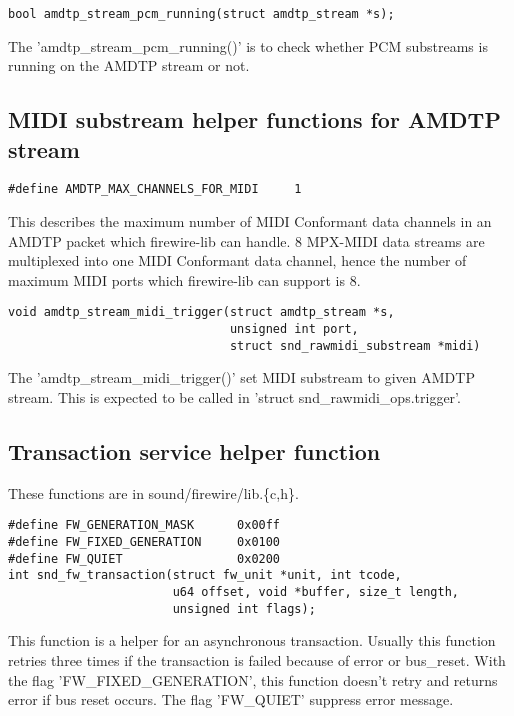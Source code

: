 \documentclass[onecolumn]{jarticle}
\begin{document}
\begin{verbatim}
bool amdtp_stream_pcm_running(struct amdtp_stream *s);
\end{verbatim}

The 'amdtp\_stream\_pcm\_running()' is to check whether PCM substreams is running on the AMDTP stream or not.


\subsection{MIDI substream helper functions for AMDTP stream}

\begin{verbatim}
#define AMDTP_MAX_CHANNELS_FOR_MIDI     1
\end{verbatim}

This describes the maximum number of MIDI Conformant data channels in an AMDTP packet which firewire-lib can handle. 8 MPX-MIDI data streams are multiplexed into one MIDI Conformant data channel\cite{amei-rp27, iec61883-6-2}, hence the number of maximum MIDI ports which firewire-lib can support is 8.

\begin{verbatim}
void amdtp_stream_midi_trigger(struct amdtp_stream *s,
                               unsigned int port,
                               struct snd_rawmidi_substream *midi)
\end{verbatim}

The 'amdtp\_stream\_midi\_trigger()' set MIDI substream to given AMDTP stream. This is expected to be called in 'struct snd\_rawmidi\_ops.trigger'.


\subsection{Transaction service helper function}

These functions are in sound/firewire/lib.\{c,h\}.

\begin{verbatim}
#define FW_GENERATION_MASK      0x00ff
#define FW_FIXED_GENERATION     0x0100
#define FW_QUIET                0x0200
int snd_fw_transaction(struct fw_unit *unit, int tcode,
                       u64 offset, void *buffer, size_t length,
                       unsigned int flags);
\end{verbatim}

This function is a helper for an asynchronous transaction. Usually this function retries three times if the transaction is failed because of error or bus\_reset. With the flag 'FW\_FIXED\_GENERATION', this function doesn't retry and returns error if bus reset occurs. The flag 'FW\_QUIET' suppress error message.
\end{document}
